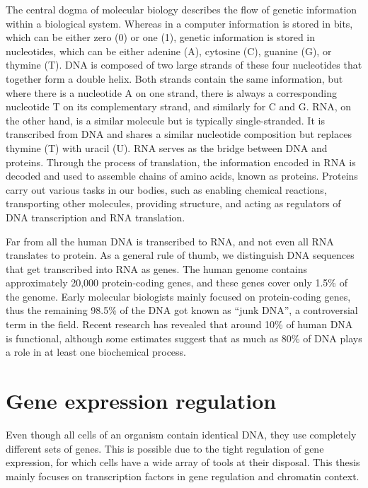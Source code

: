 The central dogma of molecular biology describes the flow of genetic information within a biological system. Whereas in a computer information is stored in bits, which can be either zero (0) or one (1), genetic information is stored in nucleotides, which can be either adenine (A), cytosine (C), guanine (G), or thymine (T). DNA is composed of two large strands of these four nucleotides that together form a double helix. Both strands contain the same information, but where there is a nucleotide A on one strand, there is always a corresponding nucleotide T on its complementary strand, and similarly for C and G. RNA, on the other hand, is a similar molecule but is typically single-stranded. It is transcribed from DNA and shares a similar nucleotide composition but replaces thymine (T) with uracil (U). RNA serves as the bridge between DNA and proteins. Through the process of translation, the information encoded in RNA is decoded and used to assemble chains of amino acids, known as proteins. Proteins carry out various tasks in our bodies, such as enabling chemical reactions, transporting other molecules, providing structure, and acting as regulators of DNA transcription and RNA translation.

Far from all the human DNA is transcribed to RNA, and not even all RNA translates to protein. As a general rule of thumb, we distinguish DNA sequences that get transcribed into RNA as genes. The human genome contains approximately 20,000 protein-coding genes, and these genes cover only 1.5\% of the genome\cite{Piovesan2019}. Early molecular biologists mainly focused on protein-coding genes, thus the remaining 98.5\% of the DNA got known as ``junk DNA'', a controversial term in the field\cite{Graur2013}. Recent research has revealed that around 10\% of human DNA is functional\cite{Graur2013}, although some estimates suggest that 
as much as 80\% of DNA plays a role in at least one biochemical process\cite{encode2012}.

\section{Gene expression regulation}

Even though all cells of an organism contain identical DNA, they use completely different sets of genes. This is possible due to the tight regulation of gene expression, for which cells have a wide array of tools at their disposal. This thesis mainly focuses on transcription factors in gene regulation and chromatin context.

